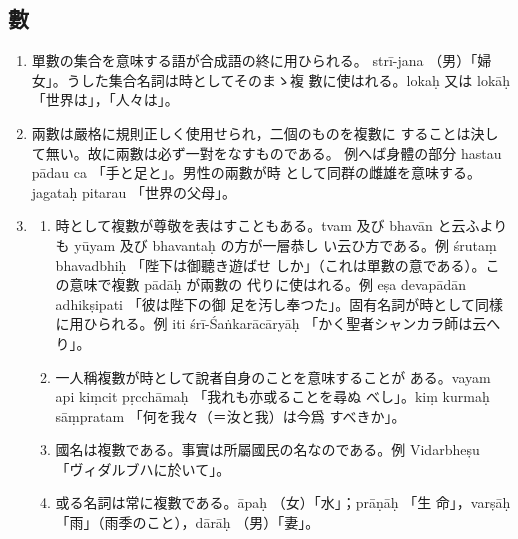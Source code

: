 \subsection{數}
\numberParagraph \label{np:218}
\begin{enumerate}[label=(\arabic*)]
\item 單數の集合を意味する語が合成語の終に用ひられる。
strī-jana （男）「婦女」。うした集合名詞は時としてそのまゝ複
數に使はれる。lokaḥ 又は lokāḥ 「世界は」，「人々は」。
\item 兩數は嚴格に規則正しく使用せられ，二個のものを複數に
することは決して無い。故に兩數は必ず一對をなすものである。
例へば身體の部分 hastau pādau ca 「手と足と」。男性の兩數が時
として同群の雌雄を意味する。jagataḥ pitarau 「世界の父母」。
\item \label{item:2183}
\begin{enumerate}[label=(\alph*), ref=\alph*]
\item \label{item:2183a} 時として複數が尊敬を表はすこともある。tvam 及び
bhavān と云ふよりも yūyam 及び bhavantaḥ の方が一層恭し
い云ひ方である。例 śrutaṃ bhavadbhiḥ 「陛下は御聽き遊ばせ
しか」（これは單數の意である）。この意味で複數 pādāḥ が兩數の
代りに使はれる。例 eṣa devapādān adhikṣipati 「彼は陛下の御
足を汚し奉つた」。固有名詞が時として同樣に用ひられる。例 iti
śrī-Śaṅkarācāryāḥ 「かく聖者シャンカラ師は云へり」。
\item 一人稱複數が時として說者自身のことを意味することが
ある。vayam api kiṃcit pṛcchāmaḥ 「我れも亦或ることを尋ぬ
べし」。kiṃ kurmaḥ sāṃpratam 「何を我々（＝汝と我）は今爲
すべきか」。
\item 國名は複數である。事實は所屬國民の名なのである。例
Vidarbheṣu 「ヴィダルブハに於いて」。
\item 或る名詞は常に複數である。āpaḥ （女）「水」；prāṇāḥ 「生
命」，varṣāḥ 「雨」（雨季のこと），dārāḥ （男）「妻」。
\end{enumerate}
\end{enumerate}

